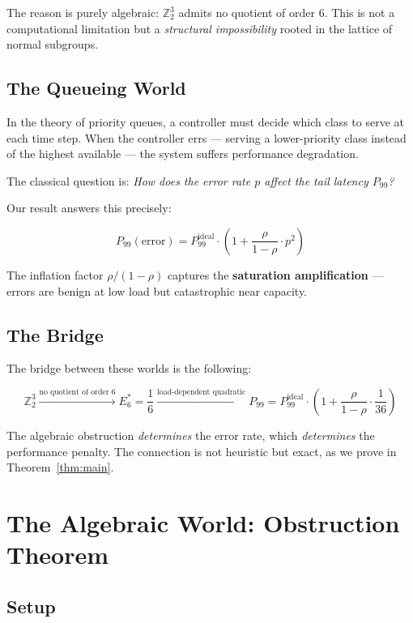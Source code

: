 \documentclass[11pt]{article}
\begin{document}
The reason is purely algebraic: $\mathbb{Z}_2^3$ admits no quotient of order 6. This is not a computational limitation but a \textit{structural impossibility} rooted in the lattice of normal subgroups.

\subsection{The Queueing World}

In the theory of priority queues, a controller must decide which class to serve at each time step. When the controller errs --- serving a lower-priority class instead of the highest available --- the system suffers performance degradation.

The classical question is: \textit{How does the error rate $p$ affect the tail latency $P_{99}$?}

Our result answers this precisely:

$$P_{99}(\text{error}) = P_{99}^{\text{ideal}} \cdot \left(1 + \frac{\rho}{1-\rho} \cdot p^2\right)$$

The inflation factor $\rho/(1-\rho)$ captures the \textbf{saturation amplification} --- errors are benign at low load but catastrophic near capacity.

\subsection{The Bridge}

The bridge between these worlds is the following:

$$\boxed{\mathbb{Z}_2^3 \xrightarrow{\text{no quotient of order 6}} E_6^* = \frac{1}{6} \xrightarrow{\text{load-dependent quadratic}} P_{99} = P_{99}^{\text{ideal}} \cdot \left(1 + \frac{\rho}{1-\rho} \cdot \frac{1}{36}\right)}$$

The algebraic obstruction \textit{determines} the error rate, which \textit{determines} the performance penalty. The connection is not heuristic but exact, as we prove in Theorem~\ref{thm:main}.

\section{The Algebraic World: Obstruction Theorem}

\subsection{Setup}
\end{document}
